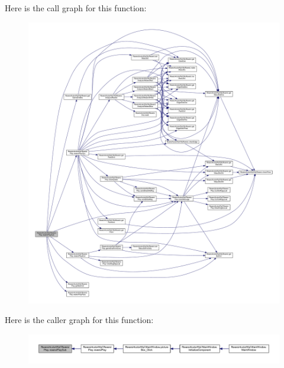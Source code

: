 Here is the call graph for this function\+:
\nopagebreak
\begin{figure}[H]
\begin{center}
\leavevmode
\includegraphics[width=350pt]{class_reversi4color_wpf_1_1_reversi_play_a44bb5fb6cfa685baef758a8129bd9d36_cgraph}
\end{center}
\end{figure}




Here is the caller graph for this function\+:
\nopagebreak
\begin{figure}[H]
\begin{center}
\leavevmode
\includegraphics[width=350pt]{class_reversi4color_wpf_1_1_reversi_play_a44bb5fb6cfa685baef758a8129bd9d36_icgraph}
\end{center}
\end{figure}


